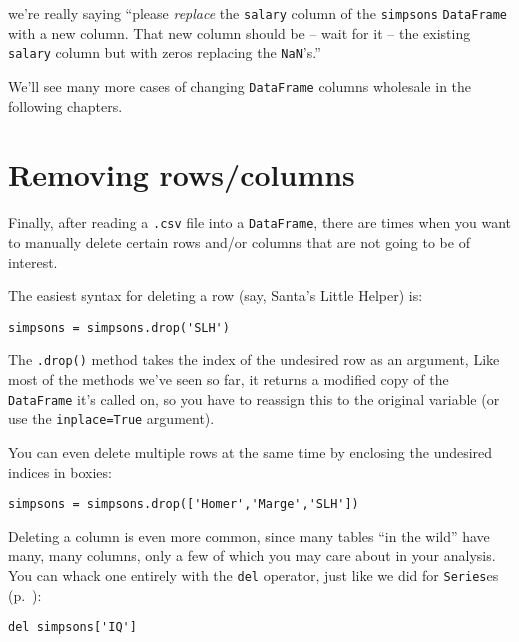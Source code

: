 we're really saying ``please \textit{replace} the \texttt{salary} column of the
\texttt{simpsons} \texttt{DataFrame} with a new column. That new column should
be -- wait for it -- the existing \texttt{salary} column but with zeros
replacing the \texttt{NaN}'s.''

We'll see many more cases of changing \texttt{DataFrame} columns wholesale in
the following chapters.

\section{Removing rows/columns}

Finally, after reading a \texttt{.csv} file into a \texttt{DataFrame}, there
are times when you want to manually delete certain rows and/or columns that are
not going to be of interest.


\begin{samepage}

The easiest syntax for deleting a row (say, Santa's Little Helper) is:

\begin{Verbatim}[fontsize=\small,samepage=true,frame=single,framesep=3mm]
simpsons = simpsons.drop('SLH')
\end{Verbatim}
\end{samepage}

The \texttt{.drop()} method takes the index of the undesired row as an
argument, Like most of the methods we've seen so far, it returns a modified
copy of the \texttt{DataFrame} it's called on, so you have to reassign this to
the original variable (or use the \texttt{inplace=True} argument).


\begin{samepage}
You can even delete multiple rows at the same time by enclosing the undesired
indices in boxies:

\begin{Verbatim}[fontsize=\small,samepage=true,frame=single,framesep=3mm]
simpsons = simpsons.drop(['Homer','Marge','SLH'])
\end{Verbatim}
\end{samepage}

\begin{samepage}

Deleting a column is even more common, since many tables ``in the wild'' have
many, many columns, only a few of which you may care about in your analysis.
You can whack one entirely with the \texttt{del} operator, just like we did for
\texttt{Series}es (p.~\pageref{delOp}):

\begin{Verbatim}[fontsize=\small,samepage=true,frame=single,framesep=3mm]
del simpsons['IQ']
\end{Verbatim}
\end{samepage}
